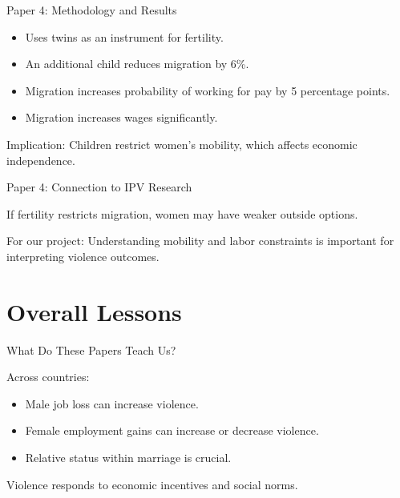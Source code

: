 \documentclass[11pt,aspectratio=169]{beamer}
\begin{document}
\begin{frame}{Paper 4: Methodology and Results}

\begin{itemize}
    \item Uses twins as an instrument for fertility.
    \item An additional child reduces migration by 6\%.
    \item Migration increases probability of working for pay by 5 percentage points.
    \item Migration increases wages significantly.
\end{itemize}

\medskip

Implication:
Children restrict women’s mobility,
which affects economic independence.

\end{frame}

\begin{frame}{Paper 4: Connection to IPV Research}

If fertility restricts migration,
women may have weaker outside options.

\medskip

For our project:
Understanding mobility and labor constraints
is important for interpreting violence outcomes.

\end{frame}

\section{Overall Lessons}

\begin{frame}{What Do These Papers Teach Us?}

Across countries:

\begin{itemize}
    \item Male job loss can increase violence.
    \item Female employment gains can increase or decrease violence.
    \item Relative status within marriage is crucial.
\end{itemize}

\medskip

Violence responds to economic incentives and social norms.

\end{frame}
\end{document}
